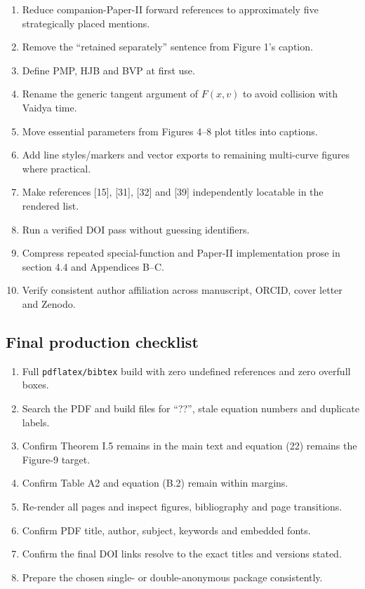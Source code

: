 \documentclass[11pt,a4paper]{article}
\begin{document}
\begin{enumerate}[label=\textbf{S\arabic*.}]
  \item Reduce companion-Paper-II forward references to approximately five strategically placed
  mentions.
  \item Remove the ``retained separately'' sentence from Figure 1's caption.
  \item Define PMP, HJB and BVP at first use.
  \item Rename the generic tangent argument of $F(x,v)$ to avoid collision with Vaidya time.
  \item Move essential parameters from Figures 4--8 plot titles into captions.
  \item Add line styles/markers and vector exports to remaining multi-curve figures where practical.
  \item Make references [15], [31], [32] and [39] independently locatable in the rendered list.
  \item Run a verified DOI pass without guessing identifiers.
  \item Compress repeated special-function and Paper-II implementation prose in section 4.4 and
  Appendices B--C.
  \item Verify consistent author affiliation across manuscript, ORCID, cover letter and Zenodo.
\end{enumerate}

\subsection{Final production checklist}

\begin{enumerate}[label=\textbf{P\arabic*.}]
  \item Full \texttt{pdflatex/bibtex} build with zero undefined references and zero overfull boxes.
  \item Search the PDF and build files for ``??'', stale equation numbers and duplicate labels.
  \item Confirm Theorem I.5 remains in the main text and equation (22) remains the Figure-9 target.
  \item Confirm Table A2 and equation (B.2) remain within margins.
  \item Re-render all pages and inspect figures, bibliography and page transitions.
  \item Confirm PDF title, author, subject, keywords and embedded fonts.
  \item Confirm the final DOI links resolve to the exact titles and versions stated.
  \item Prepare the chosen single- or double-anonymous package consistently.
\end{enumerate}
\end{document}
